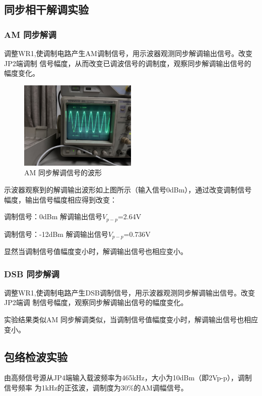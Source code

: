 \documentclass{../source/Experiment}
\begin{document}
\subsection{同步相干解调实验}
\subsubsection{AM 同步解调}
调整WR1,使调制电路产生AM调制信号，用示波器观测同步解调输出信号。改变JP2端调制
信号幅度，从而改变已调波信号的调制度，观察同步解调输出信号的幅度变化。
\begin{figure}[H]
    \centering
    \includegraphics[width = 0.5\textwidth]{lab6/5.jpg}
    \caption{AM 同步解调信号的波形}
\end{figure}

示波器观察到的解调输出波形如上图所示（输入信号0dBm），通过改变调制信号幅度，输出信号幅度相应得到改变：

调制信号：0dBm   解调输出信$号V_{p-p}$=2.64V

调制信号：-12dBm   解调输出信号$V_{p-p}$=0.736V

显然当调制信号值幅度变小时，解调输出信号也相应变小。

\subsubsection{DSB 同步解调}
调整WR1,使调制电路产生DSB调制信号，用示波器观测同步解调输出信号。改变JP2端调
制信号幅度，观察同步解调输出信号的幅度变化。

实验结果类似AM 同步解调类似，当调制信号值幅度变小时，解调输出信号也相应变小。

\subsection{包络检波实验}
由高频信号源从JP4端输入载波频率为465kHz，大小为10dBm（即2Vp-p），调制信号频率
为1kHz的正弦波，调制度为30\%的AM调幅信号。
\end{document}
